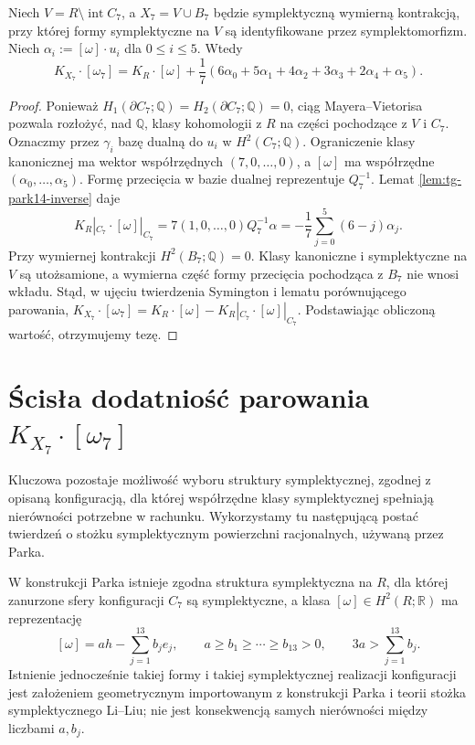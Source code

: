 \begin{stwierdzenie}
\label{prop:tg-park14-splitting}
Niech $V=R\setminus\operatorname{int}C_7$,
a $X_7=V\cup B_7$ będzie symplektyczną wymierną
kontrakcją, przy której formy symplektyczne na $V$
są identyfikowane przez symplektomorfizm.
Niech $\alpha_i:=[\omega]\cdot u_i$ dla $0\le i\le5$.
Wtedy
\[
K_{X_7}\cdot[\omega_7]
 =K_R\cdot[\omega]+
   \frac17(6\alpha_0+5\alpha_1+4\alpha_2
                    +3\alpha_3+2\alpha_4+\alpha_5).
\]
\end{stwierdzenie}

\begin{proof}
Ponieważ $H_1(\partial C_7;\mathbb Q)
=H_2(\partial C_7;\mathbb Q)=0$,
ciąg Mayera--Vietorisa pozwala rozłożyć, nad $\mathbb Q$,
klasy kohomologii z $R$ na części pochodzące z $V$ i $C_7$.
Oznaczmy przez $\gamma_i$ bazę dualną do $u_i$ w
$H^2(C_7;\mathbb Q)$. Ograniczenie klasy kanonicznej ma
wektor współrzędnych $(7,0,\ldots,0)$, a $[\omega]$
ma współrzędne $(\alpha_0,\ldots,\alpha_5)$.
Formę przecięcia w bazie dualnej reprezentuje $Q_7^{-1}$.
Lemat \ref{lem:tg-park14-inverse} daje
\[
K_R|_{C_7}\cdot[\omega]|_{C_7}
  =7(1,0,\ldots,0)Q_7^{-1}\alpha
  =-\frac17\sum_{j=0}^{5}(6-j)\alpha_j.
\]
Przy wymiernej kontrakcji $H^2(B_7;\mathbb Q)=0$.
Klasy kanoniczne i symplektyczne na $V$ są utożsamione,
a wymierna część formy przecięcia pochodząca z $B_7$
nie wnosi wkładu. Stąd, w ujęciu twierdzenia
Symington i lematu porównującego parowania,
$K_{X_7}\cdot[\omega_7]
=K_R\cdot[\omega]-K_R|_{C_7}\cdot[\omega]|_{C_7}$.
Podstawiając obliczoną wartość, otrzymujemy tezę.
\end{proof}

\section{Ścisła dodatniość parowania \texorpdfstring{$K_{X_7}\cdot[\omega_7]$}{K omega}}
\label{sec:tg-park14-positivity}

Kluczowa pozostaje możliwość wyboru struktury symplektycznej,
zgodnej z opisaną konfiguracją, dla której współrzędne klasy
symplektycznej spełniają nierówności potrzebne w rachunku.
Wykorzystamy tu następującą postać twierdzeń o stożku
symplektycznym powierzchni racjonalnych, używaną przez Parka.

\begin{twierdzenie}
\label{thm:tg-park14-cone}
W konstrukcji Parka istnieje zgodna struktura symplektyczna
na $R$, dla której zanurzone sfery konfiguracji $C_7$
są symplektyczne, a klasa $[\omega]\in H^2(R;\mathbb R)$
ma reprezentację
\[
[\omega]=a h-\sum_{j=1}^{13}b_j e_j,
\qquad
 a\ge b_1\ge\cdots\ge b_{13}>0,
\qquad 3a>\sum_{j=1}^{13}b_j.
\]
Istnienie jednocześnie takiej formy i takiej symplektycznej
realizacji konfiguracji jest założeniem geometrycznym
importowanym z konstrukcji Parka i teorii stożka
symplektycznego Li--Liu; nie jest konsekwencją
samych nierówności między liczbami $a,b_j$.
\end{twierdzenie}

